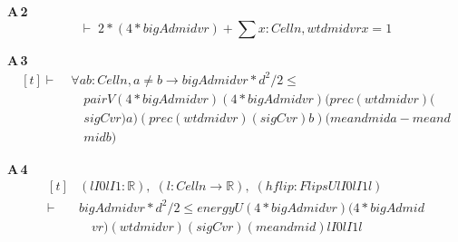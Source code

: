 \noindent\textbf{A\,2}\quad{}
{\footnotesize\[ \vdash\; 2 * (4 * \mathit{bigA} \mathit{d} \mathit{mid} \mathit{vr}) + \textstyle\sum \mathit{x} : \mathit{Cell} \mathit{n}, \mathit{wt} \mathit{d} \mathit{mid} \mathit{vr} \mathit{x} = 1 \]}

\noindent\textbf{A\,3}\quad{}
{\footnotesize\[ \begin{aligned}[t]
\vdash\;&\forall \mathit{a} \mathit{b} : \mathit{Cell} \mathit{n}, \mathit{a} \neq \mathit{b} \to \mathit{bigA} \mathit{d} \mathit{mid} \mathit{vr} * \mathit{d} ^{2} / 2 \leq\\
&\quad \mathit{pairV} (4 * \mathit{bigA} \mathit{d} \mathit{mid} \mathit{vr}) (4 * \mathit{bigA} \mathit{d} \mathit{mid} \mathit{vr}) (\mathit{prec} (\mathit{wt} \mathit{d} \mathit{mid} \mathit{vr}) (\\
&\quad \mathit{sigC} \mathit{vr}) \mathit{a}) (\mathit{prec} (\mathit{wt} \mathit{d} \mathit{mid} \mathit{vr}) (\mathit{sigC} \mathit{vr}) \mathit{b}) (\mathit{mean} \mathit{d} \mathit{mid} \mathit{a} - \mathit{mean} \mathit{d}\\
&\quad \mathit{mid} \mathit{b})
\end{aligned} \]}

\noindent\textbf{A\,4}\quad{}
{\footnotesize\[ \begin{aligned}[t]
&(\mathit{lI0} \mathit{lI1} : \mathbb{R} ),\; (\mathit{l} : \mathit{Cell} \mathit{n} \to \mathbb{R} ),\; (\mathit{hflip} : \mathit{FlipsU} \mathit{lI0} \mathit{lI1} \mathit{l})\\
\vdash\;&\mathit{bigA} \mathit{d} \mathit{mid} \mathit{vr} * \mathit{d} ^{2} / 2 \leq \mathit{energyU} (4 * \mathit{bigA} \mathit{d} \mathit{mid} \mathit{vr}) (4 * \mathit{bigA} \mathit{d} \mathit{mid}\\
&\quad \mathit{vr}) (\mathit{wt} \mathit{d} \mathit{mid} \mathit{vr}) (\mathit{sigC} \mathit{vr}) (\mathit{mean} \mathit{d} \mathit{mid}) \mathit{lI0} \mathit{lI1} \mathit{l}
\end{aligned} \]}

